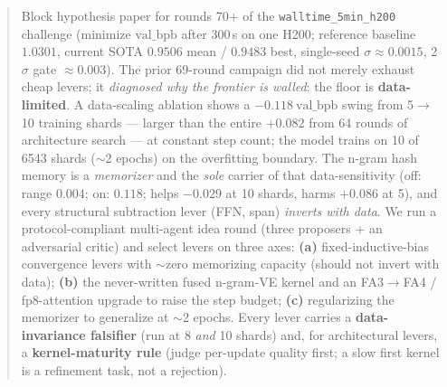 \documentclass{article}
\newcommand{\valbpb}{\mathrm{val\_bpb}}
\begin{document}
\printAffiliationsAndNotice{}

\begin{abstract}
Block hypothesis paper for rounds 70+ of the \texttt{walltime\_5min\_h200} challenge (minimize $\valbpb$ after 300\,s on one H200; reference baseline $1.0301$, current SOTA $0.9506$ mean / $0.9483$ best, single-seed $\sigma\approx0.0015$, 2$\sigma$ gate $\approx0.003$). The prior 69-round campaign did not merely exhaust cheap levers; it \emph{diagnosed why the frontier is walled}: the floor is \textbf{data-limited}. A data-scaling ablation shows a $-0.118\ \valbpb$ swing from 5$\to$10 training shards --- larger than the entire $+0.082$ from 64 rounds of architecture search --- at constant step count; the model trains on 10 of 6543 shards ($\sim$2 epochs) on the overfitting boundary. The n-gram hash memory is a \emph{memorizer} and the \emph{sole} carrier of that data-sensitivity (off: range $0.004$; on: $0.118$; helps $-0.029$ at 10 shards, harms $+0.086$ at 5), and every structural subtraction lever (FFN, span) \emph{inverts with data}. We run a protocol-compliant multi-agent idea round (three proposers + an adversarial critic) and select levers on three axes: \textbf{(a)} fixed-inductive-bias convergence levers with $\sim$zero memorizing capacity (should not invert with data); \textbf{(b)} the never-written fused n-gram-VE kernel and an FA3$\to$FA4 / fp8-attention upgrade to raise the step budget; \textbf{(c)} regularizing the memorizer to generalize at $\sim$2 epochs. Every lever carries a \textbf{data-invariance falsifier} (run at 8 \emph{and} 10 shards) and, for architectural levers, a \textbf{kernel-maturity rule} (judge per-update quality first; a slow first kernel is a refinement task, not a rejection).
\end{abstract}
\end{document}
